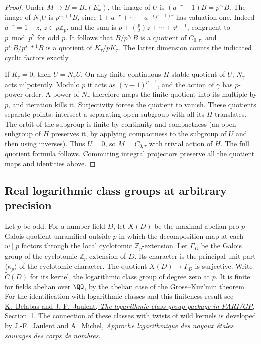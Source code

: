\documentclass[a4paper,11pt]{article}
\theoremstyle{definition}
\theoremstyle{remark}
\newcommand{\ZZ}{\mathbb Z}\newcommand{\ord}{\operatorname{ord}}
\numberwithin{equation}{section}
\begin{document}
\begin{proof}
Under \(M\to B=B_r(E_x)\), the image of \(U\) is
\((a^{-r}-1)B=p^{s_r}B\). The image of \(N_\gamma U\) is
\(p^{s_r+1}B\), since \(1+a^{-r}+\cdots+a^{-(p-1)r}\) has
valuation one. Indeed \(a^{-r}=1+z\), \(z\in p\ZZ_p\),
and the sum is \(p+\binom p2 z+\cdots+z^{p-1}\),
congruent to \(p\bmod p^2\) for odd \(p\).
It follows that \(B/p^{s_r}B\) is a quotient of \(C_{0,\tau}\),
and \(p^{s_r}B/p^{s_r+1}B\) is a quotient of \(K_\tau/pK_\tau\).
The latter dimension counts the indicated cyclic factors exactly.

If \(K_\tau=0\), then \(U=N_\gamma U\). On any finite continuous
\(H\)-stable quotient of \(U\), \(N_\gamma\) acts nilpotently.
Modulo \(p\) it acts as \((\gamma-1)^{p-1}\), and the action
of \(\gamma\) has \(p\)-power order. A power of \(N_\gamma\)
therefore maps the finite quotient into its multiple by \(p\),
and iteration kills it. Surjectivity forces the quotient to
vanish. These quotients separate points: intersect a separating
open subgroup with all its \(H\)-translates. The orbit of the
subgroup is finite by continuity and compactness (an open
subgroup of \(H\) preserves it, by applying compactness to
the subgroup of \(U\) and then using inverses).
Thus \(U=0\), so \(M=C_{0,\tau}\) with trivial action of \(H\).
The full quotient formula follows. Commuting integral projectors
preserve all the quotient maps and identities above.
\end{proof}

\subsection{Real logarithmic class groups at arbitrary precision}\label{nav:III-74}
Let \(p\) be odd. For a number field \(D\), let \(X(D)\)
be the maximal abelian pro-\(p\) Galois quotient unramified
outside \(p\) in which the decomposition map at each \(w\mid p\)
factors through the local cyclotomic \(\ZZ_p\)-extension.
Let \(\Gamma_D\) be the Galois group of the cyclotomic
\(\ZZ_p\)-extension of \(D\). Its character is the principal
unit part \(\langle\kappa_p\rangle\) of the cyclotomic
character. The quotient \(X(D)\to\Gamma_D\) is surjective.
Write \(\widetilde C(D)\) for its kernel, the logarithmic
class group of degree zero at \(p\). It is finite for
fields abelian over \(\QQ\), by the abelian case of the
Gross--Kuz'min theorem. For the identification with
logarithmic classes and this finiteness result see
\href{https://www.math.u-bordeaux.fr/~jjaulent/Articles/bnflog.pdf}
{K.~Belabas and J.-F.~Jaulent, \emph{The logarithmic class
group package in PARI/GP}, Section~1}. The connection of
these classes with twists of wild kernels is developed by
\href{https://arxiv.org/abs/0801.0919}{J.-F.~Jaulent and
A.~Michel, \emph{Approche logarithmique des noyaux
\'etales sauvages des corps de nombres}}.
\end{document}
